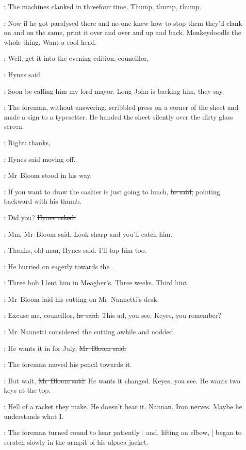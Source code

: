 :
The machines clanked in threefour time.
Thump, thump, thump.

\BloomInt:
Now if he got paralysed there
and no-one knew how to stop them
they'd clank on and on the same,
print it over and over and up and back.
Monkeydoodle the whole thing.
Want a cool head.

\hynes:
Well, get it into the evening edition, councillor,

:
Hynes said.

\BloomInt:
Soon be calling him my lord mayor.
Long John is backing him, they say.

:
The foreman, without answering,
scribbled press on a corner of the sheet
and made a sign to a typesetter.
He handed the sheet silently over the dirty glass screen.

\hynes:
Right: thanks,

:
Hynes said moving off.

:
Mr~Bloom stood in his way.

\Bloom:
If you want to draw the cashier is just going to lunch,
\sout{he said,}
pointing backward with his thumb.

\hynes:
Did you?
\sout{Hynes asked.}

\Bloom:
Mm,
\sout{Mr~Bloom said.}
Look sharp and you'll catch him.

\hynes:
Thanks, old man,
\sout{Hynes said.}
I'll tap him too.

:
He hurried on eagerly towards the .

\BloomInt:
Three bob I lent him in Meagher's.
Three weeks.
Third hint.



:
Mr~Bloom laid his cutting on Mr~Nannetti's desk.

\Bloom:
Excuse me, councillor,
\sout{he said.}
This ad, you see.
Keyes, you remember?

:
Mr~Nannetti considered the cutting awhile and nodded.

\Bloom:
He wants it in for July,
\sout{Mr~Bloom said.}

:
The foreman moved his pencil towards it.

\Bloom:
But wait,
\sout{Mr~Bloom said.}
He wants it changed.
Keyes, you see.
He wants two keys at the top.

\BloomInt:
Hell of a racket they make.
He doesn't hear it.
Nannan.
Iron nerves.
Maybe he understands what I.

:
The foreman turned round to hear patiently |
and, lifting an elbow, |
began to scratch slowly in the armpit of his alpaca jacket.

